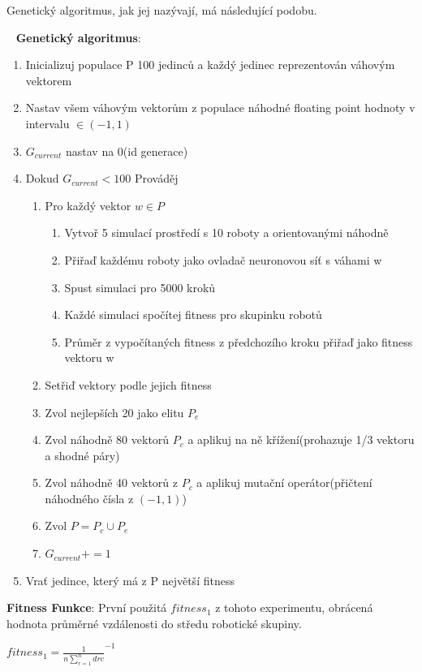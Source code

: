 Genetický algoritmus, jak jej nazývají, má následující podobu.\par 
\ \newline
\textbf{Genetický algoritmus}:
\begin{enumerate}
    \item Inicializuj populace P 100 jedinců a každý jedinec reprezentován váhovým vektorem
    \item Nastav všem váhovým vektorům z populace náhodné floating point hodnoty v intervalu $\in (-1,1)$ 
    \item $G_{current}$ nastav na 0(id generace)
    \item Dokud $G_{current} < 100$ Prováděj \begin{enumerate}
        \item Pro každý vektor $w \in P$ \begin{enumerate}
            \item Vytvoř 5 simulací prostředí s 10 roboty a orientovanými náhodně
            \item Přiřaď každému roboty jako ovladač neuronovou síť s váhami w
            \item Spust simulaci pro 5000 kroků
            \item Každé simulaci spočítej fitness pro skupinku robotů
            \item Průměr z vypočítaných fitness z předchozího kroku přiřaď jako fitness vektoru w
        \end{enumerate} 
    \item Setřiď vektory podle jejich fitness 
    \item Zvol nejlepších 20 jako elitu $P_{e}$
    \item Zvol náhodně 80 vektorů $P_c$ a aplikuj na ně křížení(prohazuje 1/3 vektoru a shodné páry)
    \item Zvol náhodně 40 vektorů z $P_c$ a aplikuj mutační operátor(přičtení náhodného čísla z $(-1,1)$)
    \item Zvol $P = P_c \cup P_e$
    \item $G_{current} += 1$
    \end{enumerate} 
    \item Vrať jedince, který má z P největší fitness    
\end{enumerate} 
\par 
\textbf{Fitness Funkce}: První použitá $fitness_1$ z tohoto experimentu, obrácená hodnota průměrné vzdálenosti do středu robotické skupiny. 
\par
\begin{center}
\textbf{$fitness_1 = {\frac{1}{n\sum\limits_{r=1}^{n} d{rc}}}^{-1} $}
\end{center}
